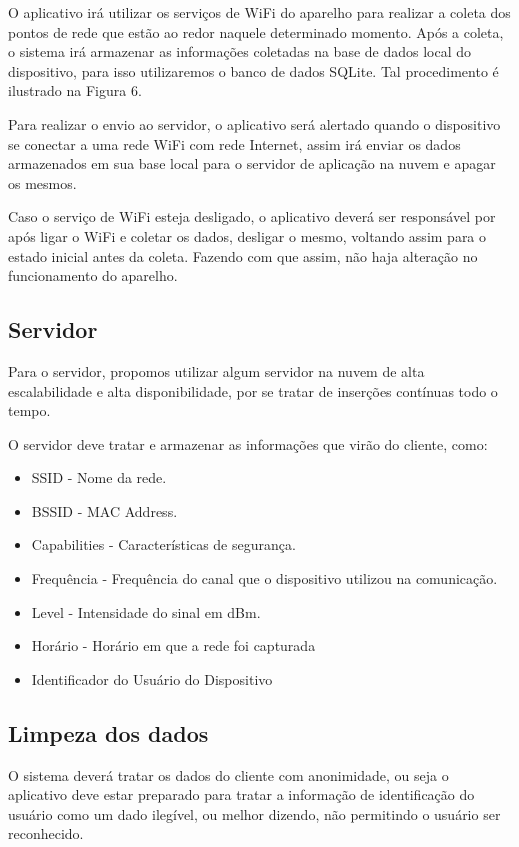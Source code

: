 \documentclass[12pt, %
openright, 
oneside,
a4paper,
brazil]{facom-ufu-abntex2}
\begin{document}
O aplicativo irá utilizar os serviços de \ac{WiFi} do aparelho para realizar a coleta dos pontos de rede que estão ao redor naquele determinado momento. Após a coleta, o sistema irá armazenar as informações coletadas na base de dados local do 	dispositivo, para isso utilizaremos o banco de dados SQLite. Tal procedimento é ilustrado na Figura 6.

Para realizar o envio ao servidor, o aplicativo será alertado quando o dispositivo se conectar a uma rede \ac{WiFi} com rede Internet, assim irá enviar os dados armazenados em sua base local para o servidor de aplicação na nuvem e apagar os mesmos. 

Caso o serviço de \ac{WiFi} esteja desligado, o aplicativo deverá ser responsável por após ligar o \ac{WiFi} e coletar os dados, desligar o mesmo, voltando assim para o estado inicial antes da coleta. Fazendo com que assim, não haja alteração no funcionamento do aparelho.




\subsection{Servidor}
Para o servidor, propomos utilizar algum servidor na nuvem de alta escalabilidade e alta disponibilidade, por se tratar de inserções contínuas todo o tempo.

O servidor deve tratar e  armazenar as informações que virão do cliente, como:
\begin{itemize}
  \item \ac{SSID} - Nome da rede.
  \item  \ac{BSSID} - MAC Address. 
  \item Capabilities - Características de segurança. 
  \item Frequência - Frequência do canal que o dispositivo utilizou na comunicação.
  \item Level - Intensidade do sinal em dBm.
  \item Horário - Horário em que a rede foi capturada
  \item Identificador do Usuário do Dispositivo
  \end{itemize}
  
\subsection{Limpeza dos dados}
O sistema deverá tratar os dados do cliente com anonimidade, ou seja o aplicativo deve estar preparado para tratar a informação de identificação do usuário como um dado ilegível, ou melhor dizendo, não permitindo o usuário ser reconhecido. 
\end{document}
